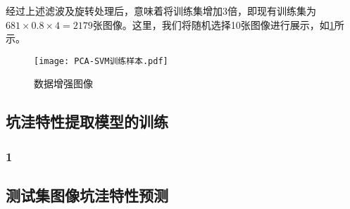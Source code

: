 \documentclass{MathorCupmodeling}
\begin{document}
	经过上述滤波及旋转处理后，意味着将训练集增加3倍，即现有训练集为$681\times 0.8\times 4=2179$张图像。这里，我们将随机选择10张图像进行展示，如\textcolor{blue}{\cref{fig:数据增强}}所示。
	\begin{figure}[H]
		\centering
		\texttt{[image: PCA-SVM训练样本.pdf]}
		\caption{数据增强图像}
		\label{fig:数据增强}
	\end{figure}
	\subsection{坑洼特性提取模型的训练}
	\subsubsection{1}
	\subsection{测试集图像坑洼特性预测}
\end{document}
